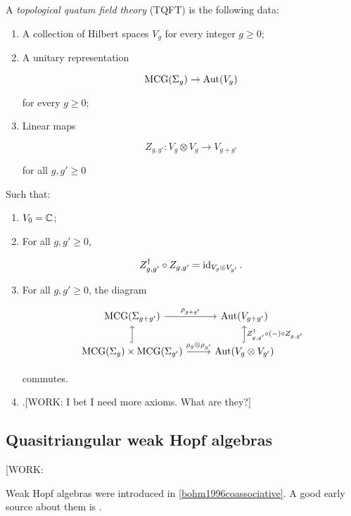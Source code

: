 \begin{definition}[TQFT] A \textit{topological quatum field theory} (TQFT) is the following data:

\begin{enumerate}
\item A collection of Hilbert spaces $V_{g}$ for every integer $g\geq 0$;
\item A unitary representation

$$\operatorname{MCG}(\Sigma_{g})\xrightarrow{}\operatorname{Aut}(V_{g})$$

for every $g\geq 0$;
\item Linear maps

$$Z_{g,g'}: V_g\otimes V_{g}\to V_{g+g'}$$

for all $g,g'\geq 0$
\end{enumerate}

Such that:

\begin{enumerate}

\item $V_{0}=\mathbb{C}$;

\item For all $g,g'\geq 0$,

$$Z_{g,g'}^\dagger \circ Z_{g,g'}=\operatorname{id}_{V_{g}\otimes V_{g'}}.$$

\item For all $g,g'\geq 0$, the diagram

\[\begin{tikzcd}
	{\MCG(\Sigma_{g+g'})} & {\Aut(V_{g+g'})} \\
	{\MCG(\Sigma_g)\times \MCG(\Sigma_{g'})} & {\Aut(V_g\otimes V_{g'})}
	\arrow["{\rho_{g+g'}}", from=1-1, to=1-2]
	\arrow[hook, from=2-1, to=1-1]
	\arrow["{\rho_{g}\otimes \rho_{g'}}", from=2-1, to=2-2]
	\arrow["{Z_{g,g'}^\dagger \circ (\--)\circ Z_{g,g'}}"', hook, from=2-2, to=1-2]
\end{tikzcd}\]

commutes.

\item .[WORK: I bet I need more axioms. What are they?]
\end{enumerate}
\end{definition}

\subsection{Quasitriangular weak Hopf algebras}

[WORK:

Weak Hopf algebras were introduced in \ref{bohm1996coassociative}. A good early source about them is \cite{nikshych2004semisimple}.

